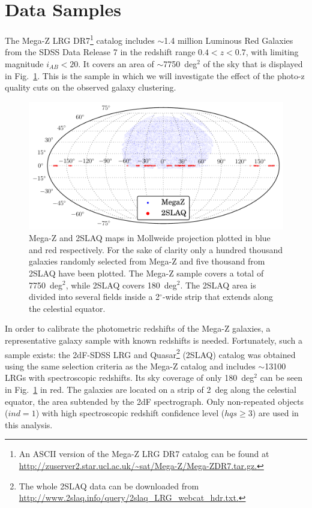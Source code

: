 \section{Data Samples}
\label{sec:data}

The Mega-Z LRG DR7\footnote{An ASCII version of the Mega-Z LRG DR7 catalog can be found at \url{http://zuserver2.star.ucl.ac.uk/~sat/Mega-Z/Mega-ZDR7.tar.gz.}} catalog \citep{Collister2007} includes $\sim$1.4 million Luminous Red Galaxies from the SDSS Data Release 7 in the redshift range $0.4< z < 0.7$, with limiting magnitude $i_{AB}<20$. It covers an area of $\sim$7750~deg$^2$ of the sky that is displayed in Fig.~\ref{scatter_map}. This is the sample in which we will investigate the effect of the photo-z quality cuts on the observed galaxy clustering. 

\begin{figure}
\centering
\includegraphics[type=pdf,ext=.pdf,read=.pdf, width=130mm]{./plots/scatter_map}
\caption{Mega-Z and 2SLAQ maps in Mollweide projection plotted in blue and red respectively. For the sake of clarity only a hundred thousand galaxies randomly selected from Mega-Z and five thousand from 2SLAQ have been plotted. The Mega-Z sample covers a total of 7750~deg$^2$, while 2SLAQ covers 180~deg$^2$. The 2SLAQ area is divided into several fields inside a 2$^\circ$-wide strip that extends along the celestial equator.} 
\label{scatter_map}
\end{figure}

In order to calibrate the photometric redshifts of the Mega-Z galaxies, a representative galaxy sample with known redshifts is needed.  Fortunately, such a sample exists: the 2dF-SDSS LRG and Quasar\footnote{The whole 2SLAQ data can be downloaded from \url{http://www.2slaq.info/query/2slaq_LRG_webcat_hdr.txt.}} (2SLAQ) catalog \citep{Cannon2006} was obtained using the same selection criteria as the Mega-Z catalog and includes $\sim$13100 LRGs with spectroscopic redshifts. Its sky coverage of only 180~deg$^2$ can be seen in Fig.~\ref{scatter_map} in red. The galaxies are located on a strip of 2~deg along the celestial equator, the area subtended by the 2dF spectrograph. Only non-repeated objects ($ind=1$) with high spectroscopic redshift confidence level ($hqs\ge3$) are used in this analysis. 

